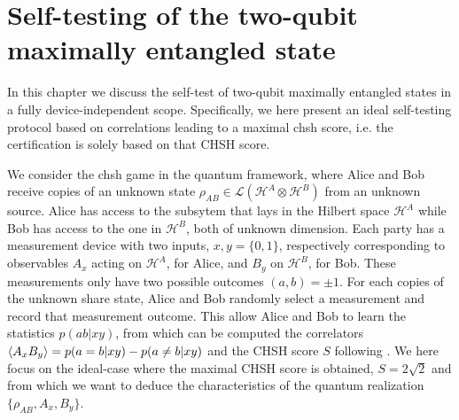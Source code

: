 \chapter{Self-testing of the two-qubit maximally entangled state}

In this chapter we discuss the self-test of two-qubit maximally entangled states in a fully device-independent scope.
Specifically, we here present an ideal self-testing protocol based on correlations leading to a maximal \acrshort{chsh} score, i.e. the certification is solely based on that CHSH score.

\medbreak 

We consider the \acrshort{chsh} game in the quantum framework, where Alice and Bob receive copies of an unknown state $\rho_{AB} \in \mathcal{L}(\mathscr{H}^A \otimes \mathscr{H}^B)$ from an unknown source.
Alice has access to the subsytem that lays in the Hilbert space $\mathscr{H}^A$ while Bob has access to the one in $\mathscr{H}^B$, both of unknown dimension.
Each party has a measurement device with two inputs, $x,y=\{0,1\}$, respectively corresponding to observables $A_x$ acting on $\mathscr{H}^A$, for Alice, and $B_y$ on $\mathscr{H}^B$, for Bob.
These measurements only have two possible outcomes $(a,b)=\pm1$.
For each copies of the unknown share state, Alice and Bob randomly select a measurement and record that measurement outcome. 
This allow Alice and Bob to learn the statistics $p(ab|xy)$, from which can be computed the correlators $\langle {A_x B_y} \rangle = p(a=b|xy)-p(a\neq b| xy)$ and the CHSH score $S$ following . 
We here focus on the ideal-case where the maximal CHSH score is obtained, $S=2\sqrt{2}$ and from which we want to deduce the characteristics of the quantum realization $\{\rho_{AB},A_x,B_y\}$.

\medbreak

